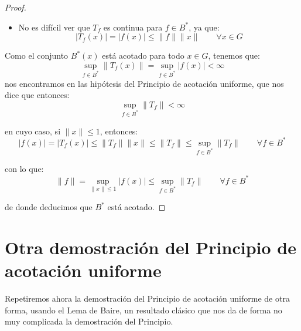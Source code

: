 \begin{coro}
\begin{proof}
\begin{itemize}
            \item No es difícil ver que $T_f$ es continua para $f\in B^\ast$, ya que:
                \begin{equation*}
                    |T_f(x)| = |f(x)| \leq \|f\|\|x\| \qquad \forall x\in G
                \end{equation*}
        \end{itemize}
        Como el conjunto $B^\ast(x)$ está acotado para todo $x\in G$, tenemos que:
        \begin{equation*}
            \sup_{f\in B^\ast}\|T_f(x)\| = \sup_{f\in B^\ast}|f(x)| < \infty
        \end{equation*}
        nos encontramos en las hipótesis del Principio de acotación uniforme, que nos dice que entonces:
        \begin{equation*}
            \sup_{f\in B^\ast}\|T_f\| < \infty
        \end{equation*}

        en cuyo caso, si $\|x\|\leq 1$, entonces:
        \begin{equation*}
            |f(x)| = |T_f(x)| \leq \|T_f\|\|x\|\leq \|T_f\| \leq \sup_{f\in B^\ast}\|T_f\| \qquad \forall f\in B^\ast
        \end{equation*}

        con lo que:
        \begin{equation*}
            \|f\| = \sup_{\|x\|\leq 1}|f(x)| \leq \sup_{f\in B^\ast}\|T_f\| \qquad \forall f\in B^\ast
        \end{equation*}

        de donde deducimos que $B^\ast$ está acotado.
    \end{proof}
\end{coro}

\section{Otra demostración del Principio de acotación uniforme}
\noindent
Repetiremos ahora la demostración del Principio de acotación uniforme de otra forma, usando el Lema de Baire, un resultado clásico que nos da de forma no muy complicada la demostración del Principio.

